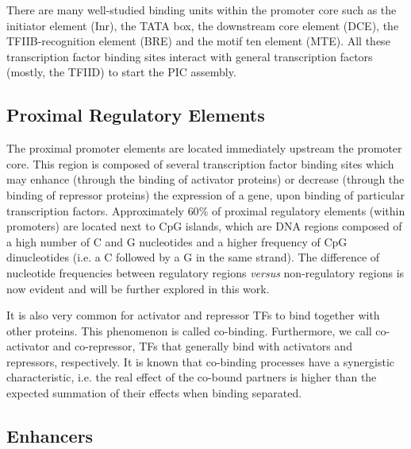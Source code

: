 There are many well-studied binding units within the promoter core such as the initiator element (Inr), the TATA box, the downstream core element (DCE), the TFIIB-recognition element (BRE) and the motif ten element (MTE). All these transcription factor binding sites interact with general transcription factors (mostly, the TFIID) to start the PIC assembly.

\subsection{Proximal Regulatory Elements}
\label{sec:proximal.regulatory.elements}

The proximal promoter elements are located immediately upstream the promoter core. This region is composed of several transcription factor binding sites which may enhance (through the binding of activator proteins) or decrease (through the binding of repressor proteins) the expression of a gene, upon binding of particular transcription factors. Approximately $60\%$ of proximal regulatory elements (within promoters) are located next to CpG islands, which are DNA regions composed of a high number of C and G nucleotides and a higher frequency of CpG dinucleotides (i.e. a C followed by a G in the same strand). The difference of nucleotide frequencies between regulatory regions \emph{versus} non-regulatory regions is now evident and will be further explored in this work.

It is also very common for activator and repressor TFs to bind together with other proteins. This phenomenon is called co-binding. Furthermore, we call co-activator and co-repressor, TFs that generally bind with activators and repressors, respectively. It is known that co-binding processes have a synergistic characteristic, i.e. the real effect of the co-bound partners is higher than the expected summation of their effects when binding separated.

\subsection{Enhancers}
\label{sec:enhancers}

